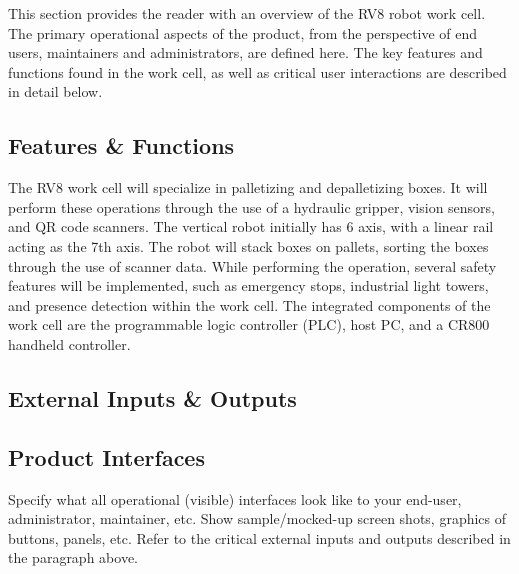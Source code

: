 This section provides the reader with an overview of the RV8 robot work cell. The primary operational aspects of the product, from the perspective of end users, maintainers and administrators, are defined here. The key features and functions found in the work cell, as well as critical user interactions are described in detail below.

\subsection{Features \& Functions}
The RV8 work cell will specialize in palletizing and depalletizing boxes. It will perform these operations through the use of a hydraulic gripper, vision sensors, and QR code scanners. The vertical robot initially has 6 axis, with a linear rail acting as the 7th axis. The robot will stack boxes on pallets, sorting the boxes through the use of scanner data. While performing the operation, several safety features will be implemented, such as emergency stops, industrial light towers, and presence detection within the work cell. The integrated components of the work cell are the programmable logic controller (PLC), host PC, and a CR800 handheld controller.

\subsection{External Inputs \& Outputs}
\begin{table}[H]
\caption{Overview of external inputs and outputs}
\end{table}

\subsection{Product Interfaces}
Specify what all operational (visible) interfaces look like to your end-user, administrator, maintainer, etc. Show sample/mocked-up screen shots, graphics of buttons, panels, etc. Refer to the critical external inputs and outputs described in the paragraph above.

